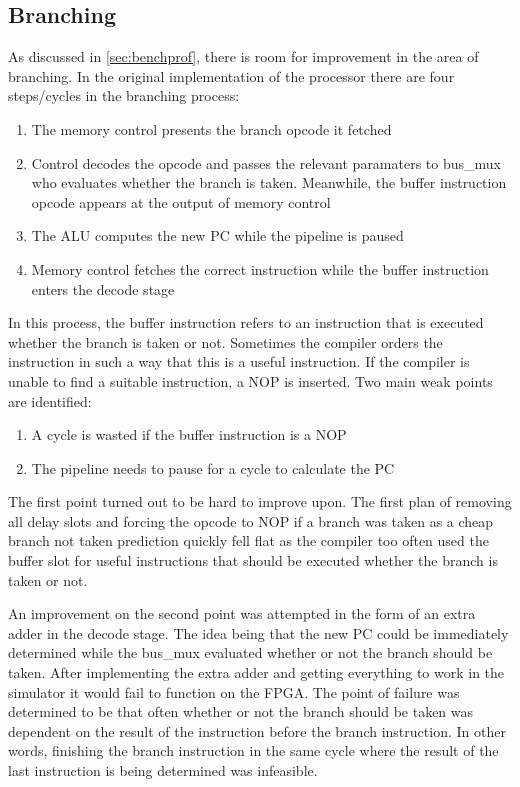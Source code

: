 \documentclass[final]{article}
\begin{document}
\subsection{Branching}
As discussed in \cref{sec:benchprof}, there is room for improvement in the area of branching. In the original implementation of the processor there are four steps/cycles in the branching process:
\begin{enumerate}
\item The memory control presents the branch opcode it fetched
\item Control decodes the opcode and passes the relevant paramaters to bus\_mux who evaluates whether the branch is taken. Meanwhile, the buffer instruction opcode appears at the output of memory control
\item The ALU computes the new PC while the pipeline is paused
\item Memory control fetches the correct instruction while the buffer instruction enters the decode stage
\end{enumerate}
In this process, the buffer instruction refers to an instruction that is executed whether the branch is taken or not. Sometimes the compiler orders the instruction in such a way that this is a useful instruction. If the compiler is unable to find a suitable instruction, a NOP is inserted. Two main weak points are identified:
\begin{enumerate}
\item A cycle is wasted if the buffer instruction is a NOP
\item The pipeline needs to pause for a cycle to calculate the PC
\end{enumerate}
The first point turned out to be hard to improve upon. The first plan of removing all delay slots and forcing the opcode to NOP if a branch was taken as a cheap branch not taken prediction quickly fell flat as the compiler too often used the buffer slot for useful instructions that should be executed whether the branch is taken or not.

An improvement on the second point was attempted in the form of an extra adder in the decode stage. The idea being that the new PC could be immediately determined while the bus\_mux evaluated whether or not the branch should be taken. After implementing the extra adder and getting everything to work in the simulator it would fail to function on the FPGA. The point of failure was determined to be that often whether or not the branch should be taken was dependent on the result of the instruction before the branch instruction. In other words, finishing the branch instruction in the same cycle where the result of the last instruction is being determined was infeasible. 
\end{document}
